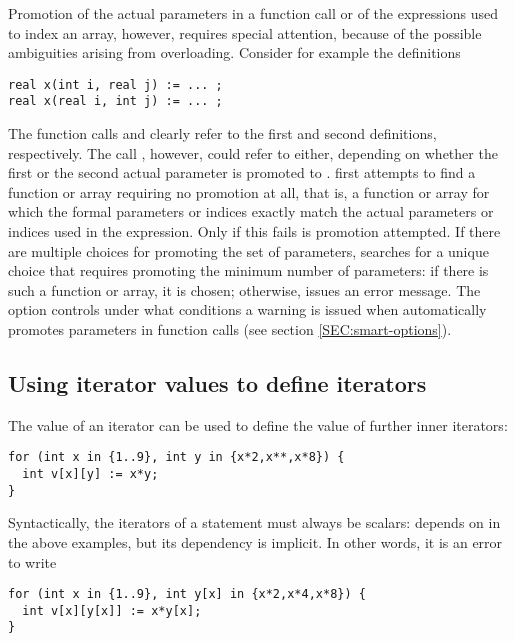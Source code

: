 Promotion of the actual parameters in a function call or of the
expressions used to index an array, however, requires special
attention, because of the possible ambiguities arising from
overloading.  Consider for example the definitions
\begin{lstlisting}
real x(int i, real j) := ... ;
real x(real i, int j) := ... ;
\end{lstlisting}
The function calls  and  clearly refer to
the first and second definitions, respectively.  The call ,
however, could refer to either, depending on whether the first or the
second actual parameter is promoted to .
{\smart} first attempts to find a function or array requiring no promotion at
all, that is, a function or array for which the formal parameters or indices
exactly match the actual parameters or indices used in the expression.
Only if this fails is promotion attempted.
If there are multiple choices for promoting the set of parameters,
{\smart} searches for a unique choice that requires promoting the minimum
number of parameters: if there is such a function or array, it is chosen;
otherwise, {\smart} issues an error message.
The option  controls under what conditions a warning is
issued when {\smart} automatically promotes parameters in function calls
(see section \ref{SEC:smart-options}).



\subsection{Using iterator values to define iterators}

The value of an iterator can be used to define the value of further inner
iterators:
\begin{lstlisting}
for (int x in {1..9}, int y in {x*2,x**,x*8}) {
  int v[x][y] := x*y;
}
\end{lstlisting}

Syntactically, the iterators of a  statement must always be
scalars:  depends on  in the above examples, but its
dependency is implicit.
In other words, it is an error to write
\begin{lstlisting}
for (int x in {1..9}, int y[x] in {x*2,x*4,x*8}) {
  int v[x][y[x]] := x*y[x];
}
\end{lstlisting}

